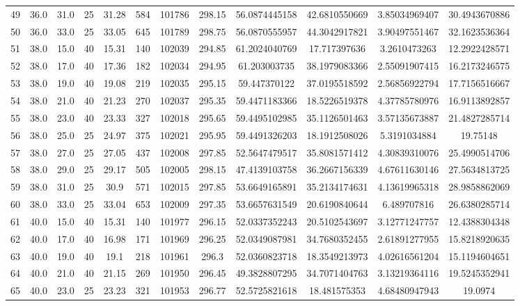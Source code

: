 \begin{table}[H]
\begin{center}
\begin{tabular}{|cccccccccccc|}
	49 & 36.0 & 31.0 & 25 & 31.28 & 584 & 101786 & 298.15 & 56.0874445158 & 42.6810550669 & 3.85034969407 & 30.4943670886\\
	50 & 36.0 & 33.0 & 25 & 33.05 & 645 & 101789 & 298.75 & 56.0870555957 & 44.3042917821 & 3.90497551467 & 32.1623536364\\
	51 & 38.0 & 15.0 & 40 & 15.31 & 140 & 102039 & 294.85 & 61.2024040769 & 17.717397636 & 3.2610473263 & 12.2922428571\\
	52 & 38.0 & 17.0 & 40 & 17.36 & 182 & 102034 & 294.95 & 61.203003735 & 38.1979083366 & 2.55091907415 & 16.2173246575\\
	53 & 38.0 & 19.0 & 40 & 19.08 & 219 & 102035 & 295.15 & 59.447370122 & 37.0195518592 & 2.56856922794 & 17.7156516667\\
	54 & 38.0 & 21.0 & 40 & 21.23 & 270 & 102037 & 295.35 & 59.4471183366 & 18.5226519378 & 4.37785780976 & 16.9113892857\\
	55 & 38.0 & 23.0 & 40 & 23.33 & 327 & 102018 & 295.65 & 59.4495102985 & 35.1126501463 & 3.57135673887 & 21.4827285714\\
	56 & 38.0 & 25.0 & 25 & 24.97 & 375 & 102021 & 295.95 & 59.4491326203 & 18.1912508026 & 5.3191034884 & 19.75148\\
	57 & 38.0 & 27.0 & 25 & 27.05 & 437 & 102008 & 297.85 & 52.5647479517 & 35.8081571412 & 4.30839310076 & 25.4990514706\\
	58 & 38.0 & 29.0 & 25 & 29.17 & 505 & 102005 & 298.15 & 47.4139103758 & 36.2667156339 & 4.67611630146 & 27.5634813725\\
	59 & 38.0 & 31.0 & 25 & 30.9 & 571 & 102015 & 297.85 & 53.6649165891 & 35.2134174631 & 4.13619965318 & 28.9858862069\\
	60 & 38.0 & 33.0 & 25 & 33.04 & 653 & 102009 & 297.35 & 53.6657631549 & 20.6190840644 & 6.489707816 & 26.6380285714\\
	61 & 40.0 & 15.0 & 40 & 15.31 & 140 & 101977 & 296.15 & 52.0337352243 & 20.5102543697 & 3.12771247757 & 12.4388304348\\
	62 & 40.0 & 17.0 & 40 & 16.98 & 171 & 101969 & 296.25 & 52.0349087981 & 34.7680352455 & 2.61891277955 & 15.8218920635\\
	63 & 40.0 & 19.0 & 40 & 19.1 & 218 & 101961 & 296.3 & 52.0360823718 & 18.3549213973 & 4.02616561204 & 15.1194604651\\
	64 & 40.0 & 21.0 & 40 & 21.15 & 269 & 101950 & 296.45 & 49.3828807295 & 34.7071404763 & 3.13219364116 & 19.5245352941\\
	65 & 40.0 & 23.0 & 25 & 23.23 & 321 & 101953 & 296.77 & 52.5725821618 & 18.481575353 & 4.68480947943 & 19.0974\\

\end{tabular}
\end{center}
\end{table}
